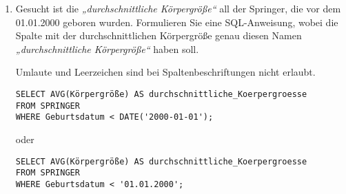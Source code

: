\documentclass{bschlangaul-aufgabe}
\begin{document}
\begin{enumerate}
%

\item Gesucht ist die \emph{„durchschnittliche Körpergröße“} all der
Springer, die vor dem 01.01.2000 geboren wurden. Formulieren Sie eine
SQL-Anweisung, wobei die Spalte mit der durchschnittlichen Körpergröße
genau diesen Namen \emph{„durchschnittliche Körpergröße“} haben soll.

\begin{bAntwort}
Umlaute und Leerzeichen sind bei Spaltenbeschriftungen nicht erlaubt.

\begin{verbatim}
SELECT AVG(Körpergröße) AS durchschnittliche_Koerpergroesse
FROM SPRINGER
WHERE Geburtsdatum < DATE('2000-01-01');
\end{verbatim}
\end{bAntwort}

oder

\begin{bAntwort}
\begin{verbatim}
SELECT AVG(Körpergröße) AS durchschnittliche_Koerpergroesse
FROM SPRINGER
WHERE Geburtsdatum < '01.01.2000';
\end{verbatim}
\end{bAntwort}

\end{enumerate}
\end{document}
